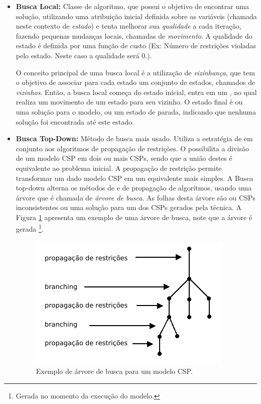 \begin{itemize}
  \item{\textbf{Busca Local:} Classe de algoritmo, que possui o
  objetivo de encontrar uma solução, utilizando uma atribuição inicial
  definida sobre as variáveis (chamada neste contexto
  de \textit{estado}) e tenta melhorar sua \textit{qualidade} a cada
  iteração, fazendo pequenas mudanças locais, chamadas
  de \textit{movimento}. A qualidade do estado é definida por uma
  função de custo (Ex: Número de restrições violadas pelo
  estado. Neste caso a qualidade será 0.).

  O conceito principal de uma busca local é a utilização
  de \textit{vizinhança}, que tem o objetivo de associar para cada
  estado um conjunto de estados, chamados de \textit{vizinhos}. Então,
  a busca local começa do estado inicial, entra em um , no
  qual realiza um movimento de um estado para seu vizinho. O estado
  final é ou uma solução para o modelo, ou um estado de parada,
  indicando que nenhuma solução foi encontrada até este estado.}

  \item{\textbf{Busca Top-Down:} Método de busca mais usado. Utiliza a
  estratégia de  em conjunto aos algoritmos de
  propagação de restrições. O  possibilita a divisão
  de um modelo CSP em dois ou mais CSPs, sendo que a união destes é
  equivalente ao problema inicial. A propagação de restrição permite
  transformar um dado modelo CSP em um equivalente mais simples. A
  Busca top-down alterna os métodos de  e de
  propagação de algoritmos, usando uma árvore que é chamada
  de \textit{árvore de busca}. As folhas desta árvore são ou CSPs
  inconsistentes ou uma solução para um dos CSPs gerados pela
  técnica. A Figura \ref{fig:searchtree} apresenta um exemplo de uma
  árvore de busca, note que a árvore é
  gerada \footnote{Gerada no momento da execução do
  modelo.}.

  \begin{figure}[h]
  \centering 
  \includegraphics{images/searchtree.png}
  \caption{Exemplo de árvore de busca para um modelo CSP.}
  \label{fig:searchtree}
  \end{figure}

}
\end{itemize}
